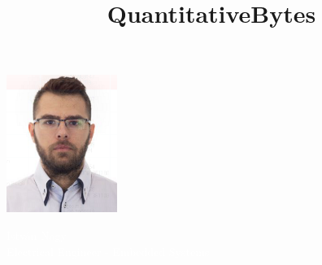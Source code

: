 \documentclass[11pt,oneslide,a4paper,titlepage]{article}
\title{QuantitativeBytes}
\date{}
\begin{document}

\begin{tcolorbox}
	\begin{minipage}{4.5cm}
		\hspace*{0.3cm}\includegraphics[width=3.6cm]{pictures/pic.png}
	\end{minipage}
	\begin{minipage}{15cm}
		\begin{center}
			\Huge{\textcolor{white}{István Nagy}} \\
			\vspace*{0.5cm}
			\Large{\textcolor{white}{{Electrical Engineer - Embedded Systems}}}
		\end{center}
	\end{minipage}
\end{tcolorbox}
\end{document}
